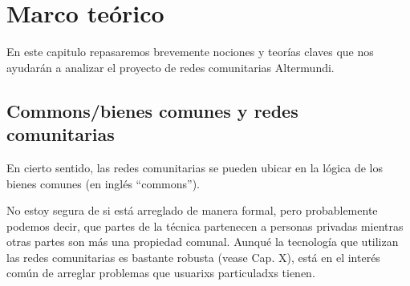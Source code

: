 \section{Marco teórico}

En este capitulo repasaremos brevemente nociones y teorías claves que nos ayudarán a analizar el proyecto de redes comunitarias Altermundi.

\subsection{Commons/bienes comunes y redes comunitarias}


En cierto sentido, las redes comunitarias se pueden ubicar en la lógica de los bienes comunes (en inglés ``commons'').

No estoy segura de si está arreglado de manera formal, pero probablemente podemos decir, que partes de la técnica partenecen a personas privadas mientras otras partes son más una propiedad comunal.
Aunqué la tecnología que utilizan las redes comunitarias es bastante robusta (vease Cap. X), está en el interés común de arreglar problemas que usuarixs particuladxs tienen.

